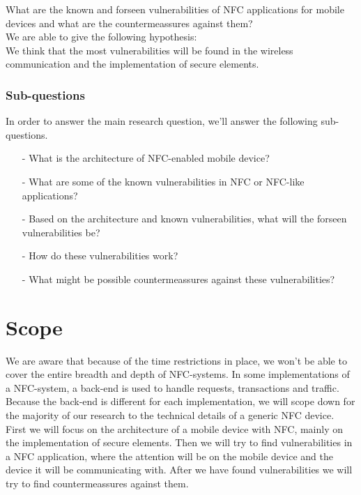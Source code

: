 \documentclass[11pt]{article} %
\begin{document}
\noindent What are the known and forseen vulnerabilities of NFC applications for mobile devices and what are the countermeassures against them? %
\\

\noindent We are able to give the following hypothesis:
\\

\noindent We think that the most vulnerabilities will be found in the wireless communication and the implementation of secure elements. %

\subsubsection{Sub-questions}

In order to answer the main research question, we'll answer the following sub-questions.
\begin{itemize}
\item [-] What is the architecture of NFC-enabled mobile device?

\item [-] What are some of the known vulnerabilities in NFC or NFC-like applications?

\item [-] Based on the architecture and known vulnerabilities, what will the forseen vulnerabilities be?

\item [-] How do these vulnerabilities work?

\item [-] What might be possible countermeassures against these vulnerabilities?

\end{itemize}

\section{Scope}
We are aware that because of the time restrictions in place, we won't be able to cover the entire breadth and depth of NFC-systems. In some implementations of a NFC-system, a back-end is used to handle requests, transactions and traffic. Because the back-end is different for each implementation, we will scope down for the majority of our research to the technical details of a generic NFC device. First we will focus on the architecture of a mobile device with NFC, mainly on the implementation of secure elements. Then we will try to find vulnerabilities in a NFC application, where the attention will be on the mobile device and the device it will be communicating with. After we have found vulnerabilities we will try to find countermeassures against them. 
\end{document}
